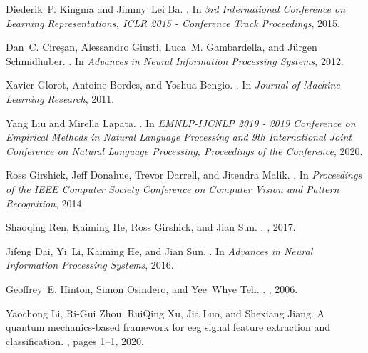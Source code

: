 \documentclass[12pt]{article}
\begin{document}
\begin{thebibliography}{100}
Diederik~P. Kingma and Jimmy~Lei Ba.
.
\newblock In {\em 3rd International Conference on Learning Representations,
  ICLR 2015 - Conference Track Proceedings}, 2015.

Dan~C. Cireşan, Alessandro Giusti, Luca~M. Gambardella, and J{\"{u}}rgen
  Schmidhuber.
.
\newblock In {\em Advances in Neural Information Processing Systems}, 2012.

Xavier Glorot, Antoine Bordes, and Yoshua Bengio.
.
\newblock In {\em Journal of Machine Learning Research}, 2011.

Yang Liu and Mirella Lapata.
.
\newblock In {\em EMNLP-IJCNLP 2019 - 2019 Conference on Empirical Methods in
  Natural Language Processing and 9th International Joint Conference on Natural
  Language Processing, Proceedings of the Conference}, 2020.

Ross Girshick, Jeff Donahue, Trevor Darrell, and Jitendra Malik.
.
\newblock In {\em Proceedings of the IEEE Computer Society Conference on
  Computer Vision and Pattern Recognition}, 2014.

Shaoqing Ren, Kaiming He, Ross Girshick, and Jian Sun.
.
,
  2017.

Jifeng Dai, Yi~Li, Kaiming He, and Jian Sun.
.
\newblock In {\em Advances in Neural Information Processing Systems}, 2016.

Geoffrey~E. Hinton, Simon Osindero, and Yee~Whye Teh.
.
, 2006.

Yaochong Li, Ri-Gui Zhou, RuiQing Xu, Jia Luo, and Shexiang Jiang.
\newblock A quantum mechanics-based framework for eeg signal feature extraction
  and classification.
, pages 1--1,
  2020.


\end{thebibliography}
\end{document}
